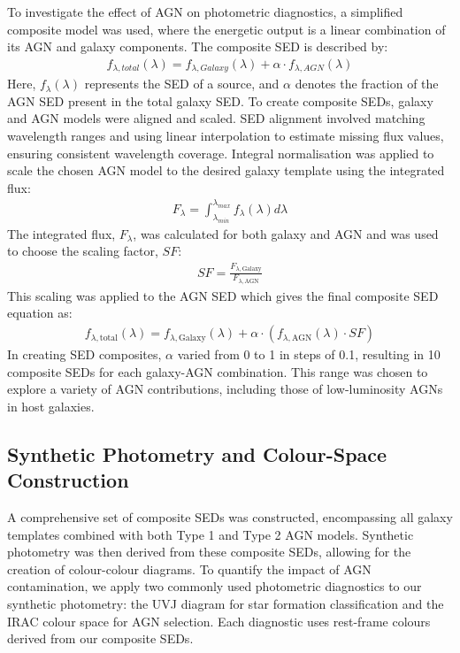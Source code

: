 \documentclass[
  journal=pasa,
  manuscript=research-paper,
  year=202X,
  volume=YY,
]{cup-journal}
\begin{document}
To investigate the effect of AGN on photometric diagnostics, a simplified composite model was used, where the energetic output is a linear combination of its AGN and galaxy components. The composite SED is described by:
\begin{align*}
f_{\lambda, total}(\lambda) = f_{\lambda, Galaxy}(\lambda) + \alpha \cdot f_{\lambda, AGN}(\lambda)
\end{align*}
Here, $f_{\lambda}(\lambda)$ represents the SED of a source, and $\alpha$ denotes the fraction of the AGN SED present in the total galaxy SED. To create composite SEDs, galaxy and AGN models were aligned and scaled. SED alignment involved matching wavelength ranges and using linear interpolation to estimate missing flux values, ensuring consistent wavelength coverage. Integral normalisation was applied to scale the chosen AGN model to the desired galaxy template using the integrated flux:
\begin{align*}
F_{\lambda} = \int_{\lambda_{min}}^{\lambda_{max}} f_\lambda(\lambda) d\lambda
\end{align*}
The integrated flux, $F_{\lambda}$, was calculated for both galaxy and AGN and was used to choose the scaling factor, $SF$:
\begin{align*}
SF = \frac{F_{\lambda, \text{Galaxy}}}{F_{\lambda, \text{AGN}}}
\end{align*}
This scaling was applied to the AGN SED which gives the final composite SED equation as:
\begin{align*}
f_{\lambda, \text{total}}(\lambda) = f_{\lambda, \text{Galaxy}}(\lambda) + \alpha \cdot (f_{\lambda, \text{AGN}}(\lambda) \cdot SF)
\end{align*}
In creating SED composites, $\alpha$ varied from 0 to 1 in steps of 0.1, resulting in 10 composite SEDs for each galaxy-AGN combination. This range was chosen to explore a variety of AGN contributions, including those of low-luminosity AGNs in host galaxies.

\subsection{Synthetic Photometry and Colour-Space Construction}
\label{subsec:syntheticphot}

A comprehensive set of composite SEDs was constructed, encompassing all galaxy templates combined with both Type 1 and Type 2 AGN models. Synthetic photometry was then derived from these composite SEDs, allowing for the creation of colour-colour diagrams. To quantify the impact of AGN contamination, we apply two commonly used photometric diagnostics to our synthetic photometry: the UVJ diagram for star formation classification and the IRAC colour space for AGN selection. Each diagnostic uses rest-frame colours derived from our composite SEDs.
\end{document}
